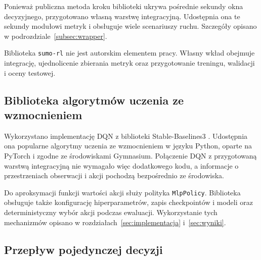 Ponieważ publiczna metoda kroku biblioteki ukrywa pośrednie sekundy okna decyzyjnego, przygotowano własną warstwę integracyjną. Udostępnia ona te sekundy modułowi metryk i obsługuje wiele scenariuszy ruchu. Szczegóły opisano w podrozdziale~\ref{subsec:wrapper}.

Biblioteka \texttt{sumo-rl} nie jest autorskim elementem pracy. Własny wkład obejmuje integrację, ujednolicenie zbierania metryk oraz przygotowanie treningu, walidacji i oceny testowej.

\subsection{Biblioteka algorytmów uczenia ze wzmocnieniem}
\label{subsec:sb3}

Wykorzystano implementację DQN z biblioteki Stable-Baselines3 \cite{raffin2021sb3}. Udostępnia ona popularne algorytmy uczenia ze wzmocnieniem w języku Python, oparte na PyTorch i zgodne ze środowiskami Gymnasium. Połączenie DQN z przygotowaną warstwą integracyjną nie wymagało więc dodatkowego kodu, a informacje o przestrzeniach obserwacji i akcji pochodzą bezpośrednio ze środowiska.

Do aproksymacji funkcji wartości akcji służy polityka \texttt{MlpPolicy}. Biblioteka obsługuje także konfigurację hiperparametrów, zapis checkpointów i modeli oraz deterministyczny wybór akcji podczas ewaluacji. Wykorzystanie tych mechanizmów opisano w rozdziałach~\ref{sec:implementacja} i~\ref{sec:wyniki}.

\subsection{Przepływ pojedynczej decyzji}
\label{subsec:przeplyw-decyzji}

